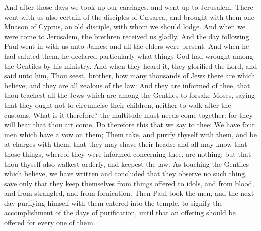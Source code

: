 And after those days we took up our carriages, and went
up to Jerusalem.  There went with us also certain of the
disciples of Cæsarea, and brought with them one Mnason of Cyprus, an old
disciple, with whom we should lodge.  And when we were
come to Jerusalem, the brethren received us gladly.  And
the day following Paul went in with us unto James; and all the elders
were present.  And when he had saluted them, he declared
particularly what things God had wrought among the Gentiles by his
ministry.  And when they heard it, they glorified the
Lord, and said unto him, Thou seest, brother, how many thousands of Jews
there are which believe; and they are all zealous of the law:
 And they are informed of thee, that thou teachest all
the Jews which are among the Gentiles to forsake Moses, saying that they
ought not to circumcise their children, neither to walk after the
customs.  What is it therefore? the multitude must needs
come together: for they will hear that thou art come.  Do
therefore this that we say to thee: We have four men which have a vow on
them;  Them take, and purify thyself with them, and be at
charges with them, that they may shave their heads: and all may know
that those things, whereof they were informed concerning thee, are
nothing; but that thou thyself also walkest orderly, and keepest the
law.  As touching the Gentiles which believe, we have
written and concluded that they observe no such thing, save only that
they keep themselves from things offered to idols, and from blood, and
from strangled, and from fornication.  Then Paul took the
men, and the next day purifying himself with them entered into the
temple, to signify the accomplishment of the days of purification, until
that an offering should be offered for every one of them.

